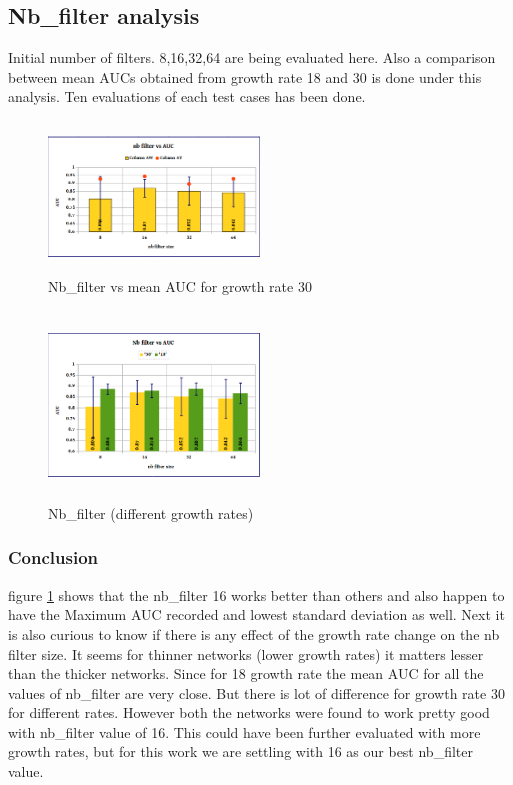 \subsection{Nb\_filter analysis}
Initial number of filters. 8,16,32,64 are being evaluated here. Also a comparison between mean AUCs obtained from growth rate 18 and 30 is done under this analysis. Ten evaluations of each test cases has been done.
\begin{figure}[ht]
\centering
\includegraphics[height=4cm,width=0.5\textwidth]{images/densenet/nb_filter_vs_auc}
\caption{Nb\_filter vs mean AUC for growth rate 30}
\label{fig:nb_filter_vs_auc}
\end{figure}

\begin{figure}[ht]
\centering
\includegraphics[height=5cm,width=0.5\textwidth]{images/densenet/nb_filter_vs_auc_growthrate_compare}
\caption{Nb\_filter (different growth rates)}
\label{fig:nb_filter_vs_auc_growthrate_compare}
\end{figure}

\subsubsection{Conclusion}
figure \ref{fig:nb_filter_vs_auc} shows that the nb\_filter 16 works better than others and also happen to have the Maximum AUC recorded and lowest standard deviation as well. 
Next it is also curious to know if there is any effect of the growth rate change on the nb filter size. It seems for thinner networks (lower growth rates) it matters lesser than the thicker networks. 
Since for 18 growth rate the mean AUC for all the values of nb\_filter are very close. But there is lot of difference for growth rate 30 for different rates.
However both the networks were found to work pretty good with nb\_filter value of 16. This could have been further evaluated with more growth rates, but for this work we are settling with 16 as our best nb\_filter value.

